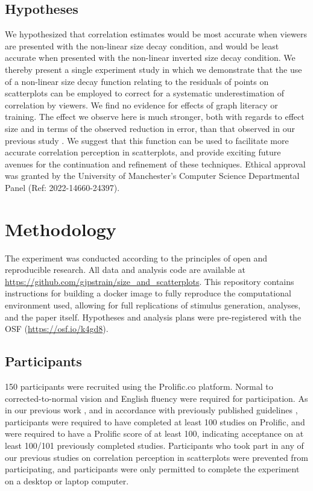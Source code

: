 \documentclass{vgtc}                          %
\begin{document}
\hypertarget{hypotheses}{%
\subsection{Hypotheses}\label{hypotheses}}

We hypothesized that correlation estimates would be most accurate when
viewers are presented with the non-linear size decay condition, and would be
least accurate when presented with the non-linear inverted size decay condition.
We thereby present a single experiment study in which we demonstrate that the use of
a non-linear size decay function relating to the residuals of points on scatterplots
can be employed to correct for a systematic underestimation of correlation by
viewers. We find no evidence for effects of graph literacy or training.
The effect we observe here is much stronger, both
with regards to effect size and in terms of the observed reduction in error, than that
observed in our previous study \cite{strain_2023}. We suggest that this
function can be used to facilitate more accurate correlation
perception in scatterplots, and provide exciting future avenues for the continuation
and refinement of these techniques. Ethical approval was granted by the University
of Manchester's Computer Science Departmental Panel (Ref: 2022-14660-24397).

\hypertarget{methodology}{%
\section{Methodology}\label{methodology}}

The experiment was conducted according to the principles of open and reproducible research.
All data and analysis code are available at \url{https://github.com/gjpstrain/size_and_scatterplots}.
This repository contains instructions for building a docker image to fully
reproduce the computational environment used, allowing for full replications
of stimulus generation, analyses, and the paper itself. Hypotheses and analysis plans were
pre-registered with the OSF (\url{https://osf.io/k4gd8}).

\hypertarget{participants}{%
\subsection{Participants}\label{participants}}

150 participants were recruited using the Prolific.co platform. Normal to
corrected-to-normal vision and English fluency were required for participation. As in our previous work
\cite{strain_2023}, and in accordance with previously published guidelines \cite{peer_2021},
participants were required to have completed at least 100 studies on Prolific, and were
required to have a Prolific score of at least 100, indicating acceptance on at least
100/101 previously completed studies. Participants who took part in any of our
previous studies on correlation perception in scatterplots
were prevented from participating, and participants were only
permitted to complete the experiment on a desktop or laptop computer.
\end{document}
